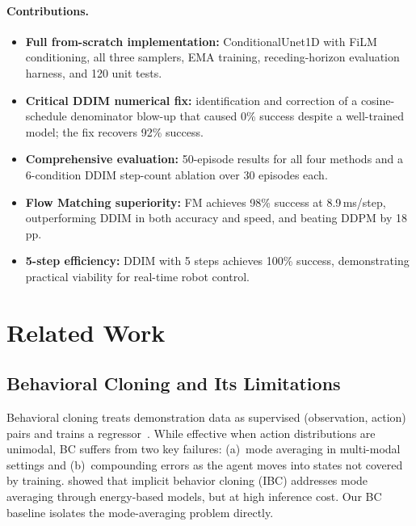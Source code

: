 \documentclass[10pt,letterpaper]{article}
\begin{document}
\paragraph{Contributions.}
\begin{itemize}[itemsep=3pt]
  \item \textbf{Full from-scratch implementation:} ConditionalUnet1D with FiLM
    conditioning, all three samplers, EMA training, receding-horizon evaluation
    harness, and 120 unit tests.
  \item \textbf{Critical DDIM numerical fix:} identification and correction of a
    cosine-schedule denominator blow-up that caused 0\% success despite a
    well-trained model; the fix recovers 92\% success.
  \item \textbf{Comprehensive evaluation:} 50-episode results for all four methods
    and a 6-condition DDIM step-count ablation over 30 episodes each.
  \item \textbf{Flow Matching superiority:} FM achieves 98\% success at 8.9\,ms/step,
    outperforming DDIM in both accuracy and speed, and beating DDPM by 18 pp.
  \item \textbf{5-step efficiency:} DDIM with 5 steps achieves 100\% success,
    demonstrating practical viability for real-time robot control.
\end{itemize}

\section{Related Work}

\subsection{Behavioral Cloning and Its Limitations}

Behavioral cloning treats demonstration data as supervised (observation, action)
pairs and trains a regressor~\citep{pomerleau1989alvinn}.
While effective when action distributions are unimodal, BC suffers from two key
failures: (a)~mode averaging in multi-modal settings and (b)~compounding errors as
the agent moves into states not covered by training.
\citet{florence2022ibc} showed that implicit behavior cloning (IBC) addresses mode
averaging through energy-based models, but at high inference cost.
Our BC baseline isolates the mode-averaging problem directly.
\end{document}
